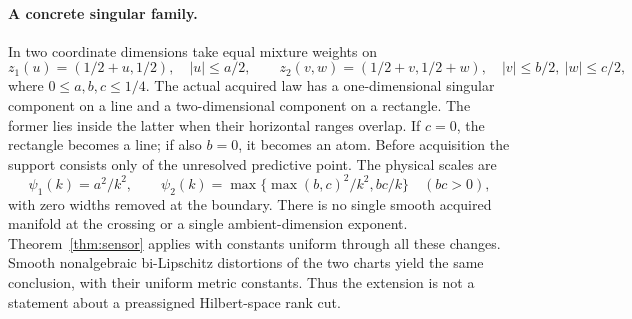 \paragraph{A concrete singular family.}
In two coordinate dimensions take equal mixture weights on
\[
 z_1(u)=(1/2+u,1/2),\quad |u|\le a/2,
 \qquad
 z_2(v,w)=(1/2+v,1/2+w),\quad |v|\le b/2,\ |w|\le c/2,
\]
where $0\le a,b,c\le1/4$. The actual acquired law has a one-dimensional singular component on a line and a two-dimensional component on a rectangle. The former lies inside the latter when their horizontal ranges overlap. If $c=0$, the rectangle becomes a line; if also $b=0$, it becomes an atom. Before acquisition the support consists only of the unresolved predictive point. The physical scales are
\[
 \psi_1(k)=a^2/k^2,\qquad
 \psi_2(k)=\max\{\max(b,c)^2/k^2,bc/k\}\quad(bc>0),
\]
with zero widths removed at the boundary. There is no single smooth acquired manifold at the crossing or a single ambient-dimension exponent. Theorem~\ref{thm:sensor} applies with constants uniform through all these changes. Smooth nonalgebraic bi-Lipschitz distortions of the two charts yield the same conclusion, with their uniform metric constants. Thus the extension is not a statement about a preassigned Hilbert-space rank cut.
